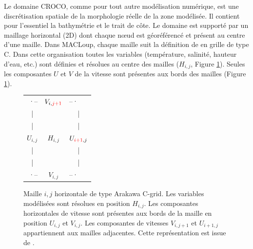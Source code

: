 \documentclass[10pt,a4paper,titlepage]{article}
\begin{document}
Le domaine CROCO, comme pour tout autre modélisation numérique, est une discrétisation spatiale de la morphologie réelle de la zone modélisée.
Il contient pour l'essentiel la bathymétrie et le trait de côte.
Le domaine est supporté par un maillage horizontal (2D) dont chaque n\oe{}ud est géoréférencé et présent au centre d'une maille.
Dans MACLoup, chaque maille suit la définition de \cite{Arakawa_C-grid_1977} en grille de type C.
Dans cette organisation toutes les variables (température, salinité, hauteur d'eau, etc.) sont définies et résolues au centre des mailles ($H_{i,j}$, Figure \ref{fig:structure_maille horizontale}).
Seules les composantes $U$ et $V$ de la vitesse sont présentes aux bords des mailles (Figure \ref{fig:structure_maille horizontale}).
\begin{figure}[h!]
    \centering
    \begin{tabular}{ c c c }
        \multicolumn{1}{r}{·--} & $V_{i,{\color{red}j+1}}$ & \multicolumn{1}{l}{--·} \\
        | & & | \\
        | & & | \\
        $U_{i,j}$ & $H_{i,j}$ & $U_{{\color{red}i+1},j}$ \\
        | & & | \\
        | & & | \\
        \multicolumn{1}{r}{·--} & \textbf{$V_{i,j}$} & \multicolumn{1}{l}{--·}
    \end{tabular}
    \caption{
        Maille $i,j$ horizontale de type Arakawa C-grid.
        Les variables modélisées sont résolues en position $H_{i,j}$.
        Les composantes horizontales de vitesse sont présentes aux bords de la maille en position $U_{i,j}$ et $V_{i,j}$.
        Les composantes de vitesses $V_{i,j+1}$ et $U_{i+1,j}$ appartiennent aux mailles adjacentes.
        Cette représentation est issue de \cite{grid_doc}.
    }
    \label{fig:structure_maille horizontale}
\end{figure}
\end{document}
